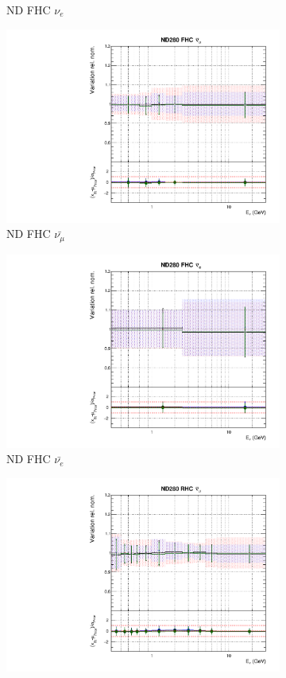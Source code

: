 \begin{figure}
\begin{subfigure}{0.24\textwidth}
  \caption{ND FHC $\nu_e$}
\end{subfigure}
\begin{subfigure}{0.24\textwidth}
  \centering
  \includegraphics[width=0.95\linewidth]{figs/polyasmvsflux_2}
  \caption{ND FHC $\bar{\nu_{\mu}}$}
\end{subfigure}
\begin{subfigure}{0.24\textwidth}
  \centering
  \includegraphics[width=0.95\linewidth]{figs/polyasmvsflux_3}
  \caption{ND FHC $\bar{\nu_{e}}$}
\end{subfigure}
\begin{subfigure}{0.24\textwidth}
  \centering
  \includegraphics[width=0.95\linewidth]{figs/polyasmvsflux_4}

\end{subfigure}
\end{figure}
